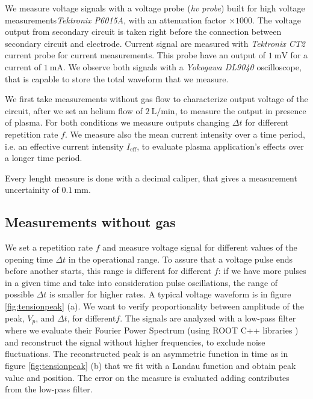We measure voltage signals with a voltage probe (\emph{hv probe}) built for high voltage measurements\emph{Tektronix P6015A}, with an attenuation factor $\times 1000$. The voltage output from secondary circuit is taken right before the connection between secondary circuit and electrode.
Current signal are measured with \emph{Tektronix CT2} current probe for current measurements. This probe have an output of $\SI{1}{\milli\volt}$ for a current of $\SI{1}{\milli\ampere}$.
We observe both signals with a \emph{Yokogawa DL9040} oscilloscope, that is capable to store the total waveform that we measure.

We first take measurements without gas flow to characterize output voltage of the circuit, after we set an helium flow of $\SI{2}{\liter/\minute}$, to measure the output in presence of plasma. For both conditions we measure outputs changing $\Delta t$ for different repetition rate $f$. We measure also the mean current intensity over a time period, i.e. an effective current intensity $I_{\text{eff}}$, to evaluate plasma application's effects over a longer time period.

Every lenght measure is done with a decimal caliper, that gives a measurement uncertainity of $\SI{0.1}{\milli\meter}$.

\subsection{Measurements without gas}
We set a repetition rate $f$ and measure voltage signal for different values of the opening time $\Delta t$ in the operational range.
To assure that a voltage pulse ends before another starts, this range is different for different $f$: if we have more pulses in a given time and take into consideration pulse oscillations, the range of possible $\Delta t$ is smaller for higher rates.
A typical voltage waveform is in figure \ref{fig:tensionpeak} (a). We want to verify proportionality between amplitude of the peak, $V_p$, and $\Delta t$, for different$f$. The signals are analyzed with a low-pass filter where we evaluate their Fourier Power Spectrum (using ROOT C++ libraries \cite{ROOT:fft}) and reconstruct the signal without higher frequencies, to exclude noise fluctuations. The reconstructed peak is an asymmetric function in time as in figure \ref{fig:tensionpeak} (b) that we fit with a Landau function \cite{ROOT:landau} and obtain peak value and position.
The error on the measure is evaluated adding contributes from the low-pass filter.

